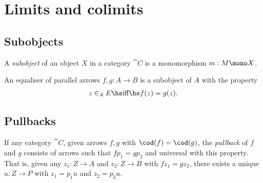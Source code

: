 \documentclass{article}
\begin{document}
\section{Limits and colimits}

\subsection{Subobjects}

\begin{definition}[Awodey p. 89]
    A \emph{subobject} of an object $X$ in a category $\cat C$ is 
    a monomorphism $m:M\mono X$.
\end{definition}

\begin{corollary}
    An equaliser of parallel arrows $f,g:A\to B$ is a subobject
    of $A$ with the property
    \begin{align*}
        z\in_A E \hs\text{iff}\hs f(z) = g(z).
    \end{align*}
\end{corollary}

\subsection{Pullbacks}

\begin{definition}[Awodey p. 92]
    If any category $\cat C$, given arrows $f,g$ with $\cod(f)=\cod(g)$, 
    the \emph{pullback} of $f$ and $g$ consists of arrows such that $fp_1=gp_2$
    and universal with this property. That is, given any $z_1:Z\to A$ and
    $z_2:Z\to B$ with $fz_1=gz_2$, there exists a unique $u:Z\to P$ with
    $z_1=p_1u$ and $z_2=p_2u$.
    \begin{center}
    \end{center}
\end{definition}
\end{document}

